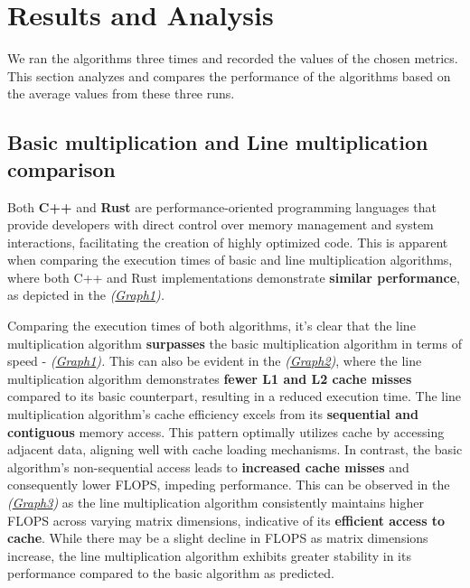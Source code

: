 \section{Results and Analysis}
We ran the algorithms three times
and recorded the values of the chosen
metrics. This section analyzes and
compares the performance of the
algorithms based on the average
values from these three runs.

\subsection{Basic multiplication and Line multiplication comparison}
Both \textbf{C++} and \textbf{Rust} are performance-oriented programming languages
that provide developers with direct control over memory
management and system interactions, facilitating the
creation of highly optimized code. This is apparent
when comparing the execution times of basic and line
multiplication algorithms, where both C++ and Rust
implementations demonstrate \textbf{similar performance}, as
depicted in the \textit{(\hyperref[graph:BLG1]{Graph1}).}

Comparing the execution times of both algorithms,
it's clear that the line multiplication algorithm
\textbf{surpasses} the basic multiplication algorithm in
terms of speed - \textit{(\hyperref[graph:BLG1]{Graph1}).} This can also be
evident in the \textit{(\hyperref[graph:BLG2]{Graph2})},
where the line multiplication algorithm demonstrates
\textbf{fewer L1 and L2 cache misses} compared to its basic
counterpart, resulting in a reduced execution time.
The line multiplication algorithm's cache efficiency excels from its
\textbf{sequential and contiguous} memory access. This pattern optimally
utilizes cache by accessing adjacent data, aligning well with
cache loading mechanisms. In contrast, the basic algorithm's
non-sequential access leads to \textbf{increased cache misses} and
consequently lower FLOPS, impeding performance.
This can be observed in the \textit{(\hyperref[graph:BLG3]{Graph3})}
as the line multiplication algorithm
consistently maintains higher FLOPS across varying
matrix dimensions, indicative of its \textbf{efficient
    access to cache}. While there may be a
slight decline in FLOPS as matrix dimensions increase, the
line multiplication algorithm exhibits
greater stability in its performance compared to the
basic algorithm as predicted.

